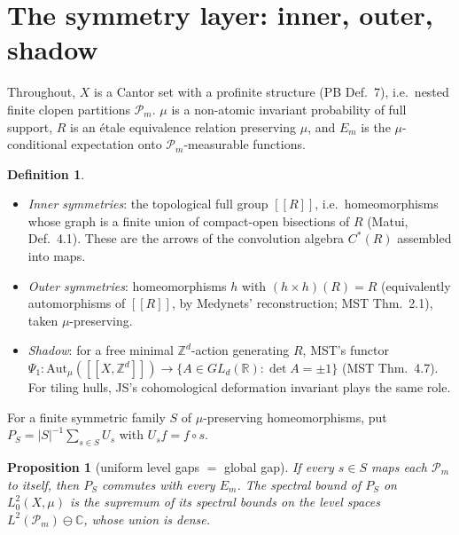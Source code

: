 \documentclass[11pt]{article}
\newtheorem{proposition}[theorem]{Proposition}
\theoremstyle{definition}
\newtheorem{definition}[theorem]{Definition}
\theoremstyle{remark}
\newcommand{\Z}{\mathbb Z}
\newcommand{\R}{\mathbb R}
\newcommand{\ff}[1]{[\![#1]\!]}
\begin{document}
\begin{abstract}
\textbf{(4) Neural Gabber--Galil lemma (walk form).} Lump the interleaved Gabber--Galil walk onto \emph{any} partition of inputs induced by the network (continuation classes, $\varepsilon$-chain classes of any layer, activation tiles) and Metropolize toward the gain-weighted class law. The result is a reversible walk on the network's own distinctions, with certified spectral gap at least $(1-5\sqrt2/8)\cdot\min h/\max h$, where $h$ is the class-averaged gain. On a random ReLU network the lumped gaps are $0.24$--$0.30$ (source $0.21$) and the gain-targeted gaps are $0.23$--$0.30$, above the certified $0.15$--$0.16$.
\end{abstract}

\tableofcontents

\section{The symmetry layer: inner, outer, shadow}

Throughout, $X$ is a Cantor set with a profinite structure (PB Def.~7), i.e.\ nested finite clopen partitions $\mathcal P_m$. $\mu$ is a non-atomic invariant probability of full support, $R$ is an \'etale equivalence relation preserving $\mu$, and $E_m$ is the $\mu$-conditional expectation onto $\mathcal P_m$-measurable functions.

\begin{definition}
\begin{itemize}
\item \emph{Inner symmetries}: the topological full group $\ff R$, i.e.\ homeomorphisms whose graph is a finite union of compact-open bisections of $R$ (Matui, Def.~4.1). These are the arrows of the convolution algebra $C^*(R)$ assembled into maps.
\item \emph{Outer symmetries}: homeomorphisms $h$ with $(h\times h)(R)=R$ (equivalently automorphisms of $\ff R$, by Medynets' reconstruction; MST Thm.~2.1), taken $\mu$-preserving.
\item \emph{Shadow}: for a free minimal $\Z^d$-action generating $R$, MST's functor $\Psi_1:\mathrm{Aut}_\mu(\ff{X,\Z^d})\to\{A\in GL_d(\R):\det A=\pm1\}$ (MST Thm.~4.7). For tiling hulls, JS's cohomological deformation invariant plays the same role.
\end{itemize}
For a finite symmetric family $S$ of $\mu$-preserving homeomorphisms, put $P_S=|S|^{-1}\sum_{s\in S}U_s$ with $U_sf=f\circ s$.
\end{definition}

\begin{proposition}[uniform level gaps $=$ global gap]\label{prop:levels}
If every $s\in S$ maps each $\mathcal P_m$ to itself, then $P_S$ commutes with every $E_m$. The spectral bound of $P_S$ on $L^2_0(X,\mu)$ is the supremum of its spectral bounds on the level spaces $L^2(\mathcal P_m)\ominus\mathbb C$, whose union is dense.
\end{proposition}
\end{document}
